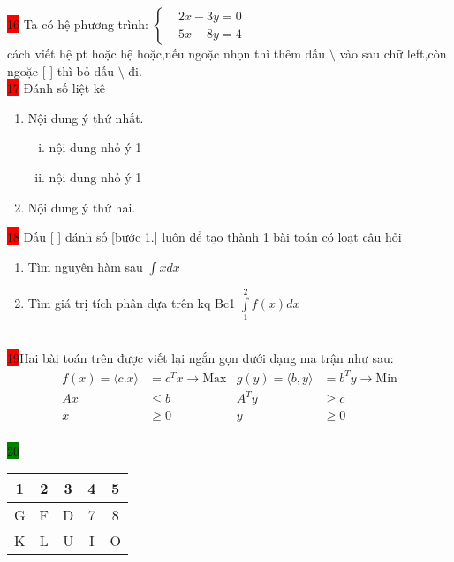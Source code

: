 \documentclass{article}
\begin{document}
 \colorbox{red}{16} Ta có hệ phương trình: $\left\{\begin{aligned}
     & 2x-3y=0\\
     & 5x-8y=4
 \end{aligned}\right.$\\
 cách viết hệ pt hoặc hệ hoặc,nếu ngoặc nhọn thì thêm dấu $\setminus$ vào sau chữ left,còn ngoặc [ ] thì bỏ dấu $\setminus$ đi.\\

\colorbox{red}{17} Đánh số liệt kê
 \begin{enumerate}
 \item Nội dung ý thứ nhất.
 \begin{enumerate}[i.]
 \item nội dung nhỏ ý 1
 \item nội dung nhỏ ý 1
 \end{enumerate}
 \item Nội dung ý thứ hai.
 \end{enumerate}

\colorbox{red}{18}  Dấu [ ] đánh số [bước 1.] luôn để tạo thành 1 bài toán có loạt câu hỏi
\begin{enumerate}[Bước 1.]
\item Tìm nguyên hàm sau $\displaystyle\int xdx $
\item Tìm giá trị tích phân dựa trên kq Bc1 $\displaystyle\int\limits_1^2f(x)dx$
\end{enumerate}\\

\colorbox{red}{19}\quad Hai bài toán trên được viết lại ngắn gọn dưới dạng ma trận như sau:
\begin{align*}
       f(x) =\langle c.x \rangle&= c^Tx \longrightarrow \text{Max}   & g(y) =\langle b,y \rangle&= b^Ty \longrightarrow \text{Min}\\
      Ax &\leq b & A^Ty &\geq c \\
     x &\geq 0 &  y &\geq 0
\end{align*}\\

\colorbox{green}{20}\\

             \begin{tabular}{|c|c|c|c|c|}
                \hline %
                \rowcolor{pink} 1 & 2 & 3 & 4 & 5 \\ %
                \hline %
                \cellcolor{yellow} G & F & D & 7 & 8 \\ %
                \hline
                K & L & \cellcolor{red} U & I & O \\ %


             \end{tabular}\\
\end{document}
